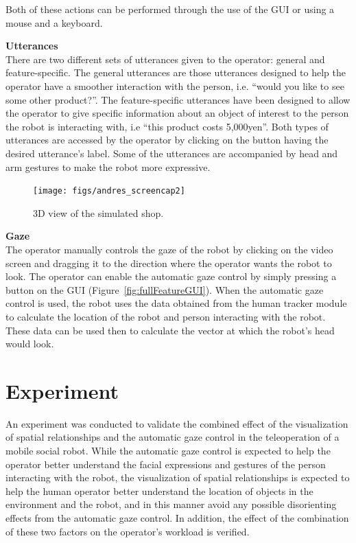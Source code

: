 \documentclass[a4paper, 10pt, conference]{ieeeconf}     %
\begin{document}
Both of these actions can be performed through the use of the GUI or using a mouse and a keyboard. 

{\bf Utterances}\\
There are two different sets of utterances given to the operator: general and feature-specific. 
The general utterances are those utterances designed to help the operator have a smoother interaction with the person, i.e. ``would you like to see some other product?''. 
The feature-specific utterances have been designed to allow the operator to give specific information about an object of interest to the person the robot is interacting with, i.e ``this product costs 5,000yen''. 
Both types of utterances are accessed by the operator by clicking on the button having the desired utterance's label. 
Some of the utterances are accompanied by head and arm gestures to make the robot more expressive. 
\begin{figure}[htp]
	\centering
		\texttt{[image: figs/andres\_screencap2]}
		\caption{3D view of the simulated shop.}
	\label{fig:simShop}
\end{figure}

{\bf Gaze}\\
The operator manually controls the gaze of the robot by clicking on the video screen and dragging it to the direction where the operator wants the robot to look.
The operator can enable the automatic gaze control by simply pressing a button on the GUI (Figure~\ref{fig:fullFeatureGUI}). 
When the automatic gaze control is used, the robot uses the data obtained from the human tracker module to calculate the location of the robot and person interacting with the robot. 
These data can be used then to calculate the vector at which the robot's head would look.

\section{Experiment}
\label{sec:experiment}
An experiment was conducted to validate the combined effect of the visualization of spatial relationships and the automatic gaze control in the teleoperation of a mobile social robot. 
While the automatic gaze control is expected to help the operator better understand the facial expressions and gestures of the person interacting with the robot, the visualization of spatial relationships is expected to help the human operator better understand the location of objects in the environment and the robot, and in this manner avoid any possible disorienting effects from the automatic gaze control. 
In addition, the effect of the combination of these two factors on the operator's workload is verified. 
\end{document}
